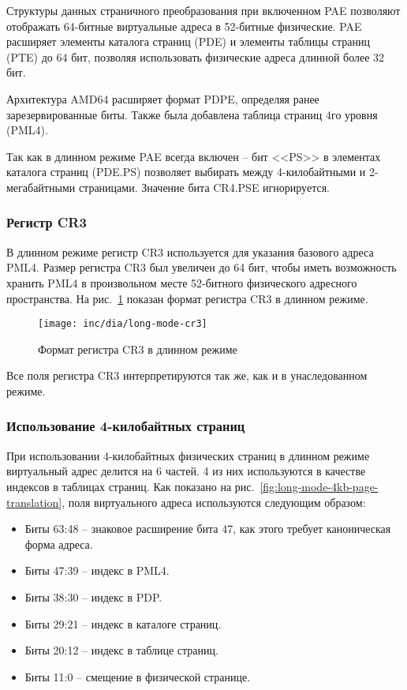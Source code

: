 Структуры данных страничного преобразования при включенном PAE позволяют отображать 64-битные
виртуальные адреса в 52-битные физические. PAE расширяет элементы каталога страниц (PDE) и
элементы таблицы страниц (PTE) до 64 бит, позволяя использовать физические адреса длинной более 32 бит.

Архитектура AMD64 расширяет формат PDPE, определяя ранее зарезервированные биты.
Также была добавлена таблица страниц 4го уровня (PML4).

Так как в длинном режиме PAE всегда включен -- бит <<PS>> в элементах каталога страниц (PDE.PS)
позволяет выбирать между 4-килобайтными и 2-мегабайтными страницами. Значение бита CR4.PSE игнорируется.

\subsubsection*{Регистр CR3}
В длинном режиме регистр CR3 используется для указания базового адреса PML4. Размер регистра CR3 был
увеличен до 64 бит, чтобы иметь возможность хранить PML4 в произвольном месте 52-битного физического
адресного пространства. На рис.~\ref{fig:long-mode-cr3} показан формат регистра CR3 в длинном режиме.

\begin{figure}[ht!]
  \centering
  \texttt{[image: inc/dia/long-mode-cr3]}
  \caption{Формат регистра CR3 в длинном режиме}
  \label{fig:long-mode-cr3}
\end{figure}

Все поля регистра CR3 интерпретируются так же, как и в унаследованном режиме.

\subsubsection*{Использование 4-килобайтных страниц}
При использовании 4-килобайтных физических страниц в длинном режиме виртуальный адрес делится на 6 частей.
4 из них используются в качестве индексов в таблицах страниц. Как показано на рис.~\ref{fig:long-mode-4kb-page-translation},
поля виртуального адреса используются следующим образом:
\begin{itemize}
\item Биты 63:48 -- знаковое расширение бита 47, как этого требует каноническая форма адреса.
\item Биты 47:39 -- индекс в PML4.
\item Биты 38:30 -- индекс в PDP.
\item Биты 29:21 -- индекс в каталоге страниц.
\item Биты 20:12 -- индекс в таблице страниц.
\item Биты 11:0 -- смещение в физической странице.
\end{itemize}


